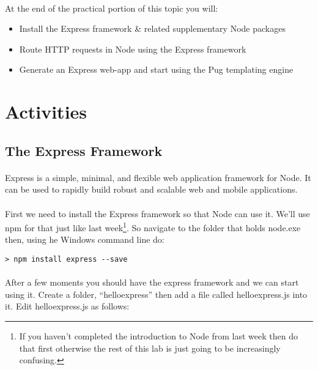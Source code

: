\documentclass[10pt, a4paper, twosize]{article}
\begin{document}
\paragraph{} At the end of the practical portion of this topic you will:

\begin{itemize}
\item Install the Express framework \& related supplementary Node packages
\item Route HTTP requests in Node using the Express framework
\item Generate an Express web-app and start using the Pug templating engine
\end{itemize}




\section{Activities}

\subsection{The Express Framework}
\paragraph{} Express is a simple, minimal, and flexible web application framework for Node. It can be used to rapidly build robust and scalable web and mobile applications.

\paragraph{} First we need to install the Express framework so that Node can use it. We'll use npm for that just like last week\footnote{If you haven't completed the introduction to Node from last week then do that first otherwise the rest of this lab is just going to be increasingly confusing.}. So navigate to the folder that holds node.exe then, using he Windows command line do:

\begin{lstlisting}[style=DOS]
    > npm install express --save
\end{lstlisting}

\paragraph{} After a few moments you should have the express framework and we can start using it. Create a folder, ``helloexpress'' then add a file called helloexpress.js into it. Edit helloexpress.js as follows:
\end{document}
